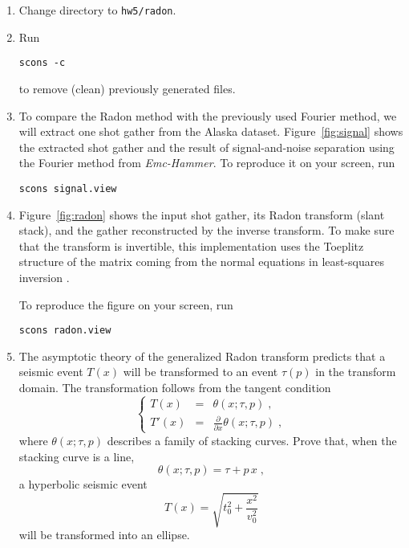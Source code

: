 \begin{enumerate}

\item Change directory to \texttt{hw5/radon}.
\item Run
\begin{verbatim}
scons -c
\end{verbatim}
to remove (clean) previously generated files.


\item To compare the Radon method with the previously used Fourier
  method, we will extract one shot gather from the Alaska
  dataset. Figure~\ref{fig:signal} shows the extracted shot gather and
  the result of signal-and-noise separation using the Fourier method from \emph{Emc-Hammer}. To reproduce it on your screen, run
\begin{verbatim}
scons signal.view
\end{verbatim}


\item Figure~\ref{fig:radon} shows the input shot gather, its Radon transform (slant stack), and the gather reconstructed by the inverse transform. To make sure that the transform is invertible, this implementation uses the Toeplitz structure of the matrix coming from the normal equations in least-squares inversion \cite[]{SEG-1990-1618}.

To reproduce the figure on your screen, run
\begin{verbatim}
scons radon.view
\end{verbatim}

\item The asymptotic theory of the generalized Radon transform predicts that a seismic event $T(x)$ will be transformed to an event $\tau(p)$ in the transform domain. The transformation follows from the tangent condition
\begin{equation}
\label{eq:tangent}
\left\{\begin{array}{rcl} T(x) & = & \theta(x;\tau,p)\;, \\
T'(x) & = & \displaystyle \frac{\partial}{\partial x} \theta(x;\tau,p)\;,
\end{array}\right.
\end{equation}
where $\theta(x;\tau,p)$ describes a family of stacking curves. Prove that, when the stacking curve is a line,
\begin{equation}
\label{eq:radon}
\theta(x;\tau,p) = \tau + p\,x\;,
\end{equation}
a hyperbolic seismic event
\begin{equation}
\label{eq:hyperbola}
T(x) = \displaystyle \sqrt{t_0^2 + \frac{x^2}{v_0^2}}
\end{equation}
will be transformed into an ellipse.


\end{enumerate}
